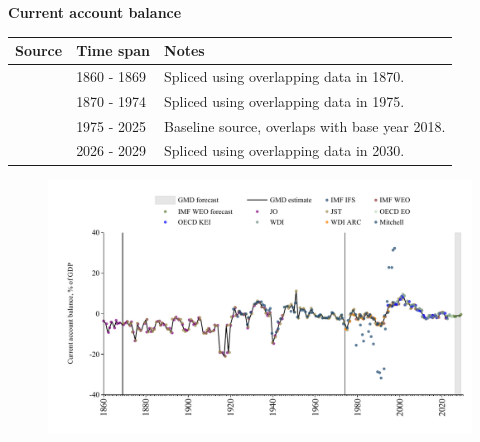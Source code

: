 \documentclass[12pt,a4paper,landscape]{article}
\begin{document}
\begin{adjustbox}{max totalsize={\paperwidth}{\paperheight},center}
\begin{minipage}[t][\textheight][t]{\textwidth}
\vspace*{0.5cm}
{}
\begin{center}
{\Large\bfseries Current account balance}
\end{center}
\vspace{0.5cm}
\begin{table}[H]
\centering
\small
\begin{tabular}{|l|l|l|}
\hline
\textbf{Source} & \textbf{Time span} & \textbf{Notes} \\
\hline
\rowcolor{white}\cite{JO}& 1860 - 1869 &Spliced using overlapping data in 1870. \\
\rowcolor{lightgray}\cite{JST}& 1870 - 1974 &Spliced using overlapping data in 1975. \\
\rowcolor{white}\cite{OECD_EO}& 1975 - 2025 &Baseline source, overlaps with base year 2018. \\
\rowcolor{lightgray}\cite{IMF_WEO_forecast}& 2026 - 2029 &Spliced using overlapping data in 2030. \\
\hline
\end{tabular}
\end{table}
\begin{figure}[H]
\centering
\includegraphics[width=\textwidth,height=0.6\textheight,keepaspectratio]{graphs/FIN_CA_GDP.pdf}
\end{figure}
\end{minipage}
\end{adjustbox}
\end{document}
